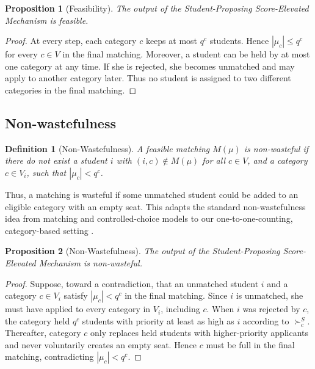 \documentclass[10pt]{article}
\newtheorem{definition}{Definition}
\newtheorem{proposition}{Proposition}
\newcommand{\1}{\mathbf{1}}
\begin{document}
\begin{proposition}[Feasibility]
\label{prop:feasibility}
The output of the Student-Proposing Score-Elevated Mechanism is feasible.
\end{proposition}

\begin{proof}
At every step, each category $c$ keeps at most $q^c$ students. Hence $|\mu_c|\le q^c$ for every $c\in V$ in the final matching. Moreover, a student can be held by at most one category at any time. If she is rejected, she becomes unmatched and may apply to another category later. Thus no student is assigned to two different categories in the final matching.
\end{proof}

\subsection{Non-wastefulness}

\begin{definition}[Non-Wastefulness]
A feasible matching $M(\mu)$ is non-wasteful if there do not exist a student $i$ with $(i,c)\notin M(\mu)$ for all $c\in V$, and a category $c\in V_i$, such that $|\mu_c|<q^c$.
\end{definition}

Thus, a matching is wasteful if some unmatched student could be added to an eligible category with an empty seat. This adapts the standard non-wastefulness idea from matching and controlled-choice models to our one-to-one-counting, category-based setting \citep{EHYY14a,GKK+17a,KHIY17a}.

\begin{proposition}[Non-Wastefulness]
\label{prop:nonwastefulness}
The output of the Student-Proposing Score-Elevated Mechanism is non-wasteful.
\end{proposition}

\begin{proof}
Suppose, toward a contradiction, that an unmatched student $i$ and a category $c\in V_i$ satisfy $|\mu_c|<q^c$ in the final matching. Since $i$ is unmatched, she must have applied to every category in $V_i$, including $c$. When $i$ was rejected by $c$, the category held $q^c$ students with priority at least as high as $i$ according to $\succ_c^S$. Thereafter, category $c$ only replaces held students with higher-priority applicants and never voluntarily creates an empty seat. Hence $c$ must be full in the final matching, contradicting $|\mu_c|<q^c$.
\end{proof}
\end{document}
